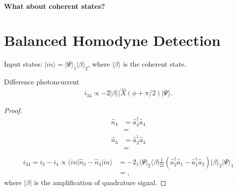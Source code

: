 \documentclass[../../note.tex]{subfiles}
\begin{document}
\textbf{What about coherent states?}

\section{Balanced Homodyne Detection}
Input states: $\vert in \rangle = \vert \Psi \rangle_1 \vert \beta \rangle_2$, where $\vert \beta \rangle$ is the coherent state.

\begin{lemma}
    Difference photoncurrent
    \begin{align}
        i_{34} \propto -2 \vert \beta \vert \langle \hat{X} \left(\phi + \pi/2 \right) \vert \Psi \rangle.
    \end{align}
\end{lemma}
\begin{proof}
    \begin{align}
        \hat{n}_4
        &= \hat{a}_4^\dagger \hat{a}_4 \\
        &= \\
        \hat{n}_3 
        &= \hat{a}_3^\dagger \hat{a}_3 \\
        &= \\
    \end{align}
    \begin{align}
        i_{34} = i_3 -i_4 \propto \langle in \vert \hat{n}_3 - \hat{n}_4 \vert in \rangle 
        &= -2 _1\langle \Psi \vert _2\langle \beta \vert \frac{1}{2 i} \left(\hat{a}_2^\dagger \hat{a}_1 - \hat{a}_1^\dagger \hat{a}_2\right) \vert \beta \rangle_2 \vert \Psi \rangle_1 \\
        &= ,
    \end{align}
    where $\vert \beta \vert$ is the amplification of quadrature signal.
\end{proof}







\end{document}
